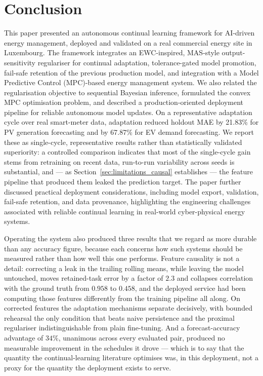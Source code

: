 \documentclass[journal]{IEEEtran}
\begin{document}
\section{Conclusion}
\label{sec:conclusion}

This paper presented an autonomous continual learning
framework for AI-driven energy management, deployed and
validated on a real commercial energy site in Luxembourg.
The framework integrates an EWC-inspired, MAS-style
output-sensitivity regulariser for continual adaptation,
tolerance-gated model promotion, fail-safe retention of the
previous production model, and integration with a Model
Predictive Control (MPC)-based energy management system.
We also related the regularisation objective to sequential
Bayesian inference, formulated the convex MPC optimisation
problem, and described a production-oriented deployment
pipeline for reliable autonomous model updates.
On a representative adaptation cycle over real smart-meter
data, adaptation reduced holdout MAE by 21.83\% for PV
generation forecasting and by 67.87\% for EV demand
forecasting. We report these as single-cycle, representative
results rather than statistically validated superiority:
a controlled comparison indicates that most of the
single-cycle gain stems from retraining on recent data,
run-to-run variability across seeds is substantial, and
--- as Section~\ref{sec:limitations_causal} establishes ---
the feature pipeline that produced them leaked the prediction
target. The paper further discussed practical deployment
considerations, including model export, validation, fail-safe
retention, and data provenance, highlighting the engineering
challenges associated with reliable continual learning in
real-world cyber-physical energy systems.

Operating the system also produced three results that we regard
as more durable than any accuracy figure, because each concerns
how such systems should be measured rather than how well this one
performs. Feature causality is not a detail: correcting a leak in
the trailing rolling means, while leaving the model untouched,
moves retained-task error by a factor of $2.3$ and collapses
correlation with the ground truth from $0.958$ to $0.458$, and the
deployed service had been computing those features differently
from the training pipeline all along. On corrected features the
adaptation mechanisms separate decisively, with bounded rehearsal
the only condition that beats naive persistence and the proximal
regulariser indistinguishable from plain fine-tuning. And a
forecast-accuracy advantage of $34\%$, unanimous across every
evaluated pair, produced no measurable improvement in the
schedules it drove --- which is to say that the quantity the
continual-learning literature optimises was, in this deployment,
not a proxy for the quantity the deployment exists to serve.
\end{document}
